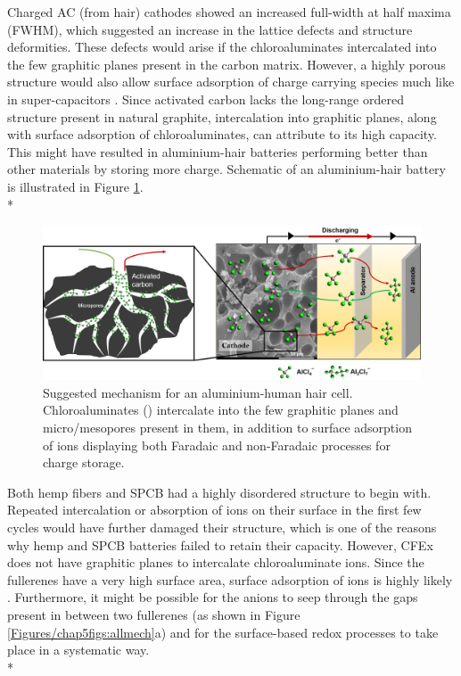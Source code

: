 Charged AC (from hair) cathodes showed an increased full-width at half maxima (FWHM), which suggested an increase in the lattice defects and structure deformities. These defects would arise if the chloroaluminates intercalated into the few graphitic planes present in the carbon matrix. However, a highly porous structure would also allow surface adsorption of charge carrying species much like in super-capacitors \cite{beguin_carbons_2014}. Since activated carbon lacks the long-range ordered structure present in natural graphite, intercalation into graphitic planes, along with surface adsorption of chloroaluminates, can attribute to its high capacity\cite{brezesinski_ordered_2010}. This might have resulted in aluminium-hair batteries performing better than other materials by storing more charge. Schematic of an aluminium-hair battery is illustrated in Figure \ref{Figures/chap5fig:achmech}.\\*

 \begin{figure}[h!]
  \centering
  \includegraphics[width=\textwidth]{Figures/chap5fig/achmech}
    \caption{Suggested mechanism for an aluminium-human hair cell. Chloroaluminates () intercalate into the few graphitic planes and micro/mesopores present in them, in addition to surface adsorption of ions displaying both Faradaic and non-Faradaic processes for charge storage.}
  \label{Figures/chap5fig:achmech}
\end{figure}

Both hemp fibers and SPCB had a highly disordered structure to begin with. Repeated intercalation or absorption of ions on their surface in the first few cycles would have further damaged their structure, which is one of the reasons why hemp and SPCB batteries failed to retain their capacity. However, CFEx does not have graphitic planes to intercalate chloroaluminate ions. Since the fullerenes have a very high surface area, surface adsorption of ions is highly likely \cite{adams_van_1994}. Furthermore, it might be possible for the anions to seep through the gaps present in between two fullerenes (as shown in Figure \ref{Figures/chap5figs:allmech}a) and for the surface-based redox processes to take place in a systematic way.\\*

